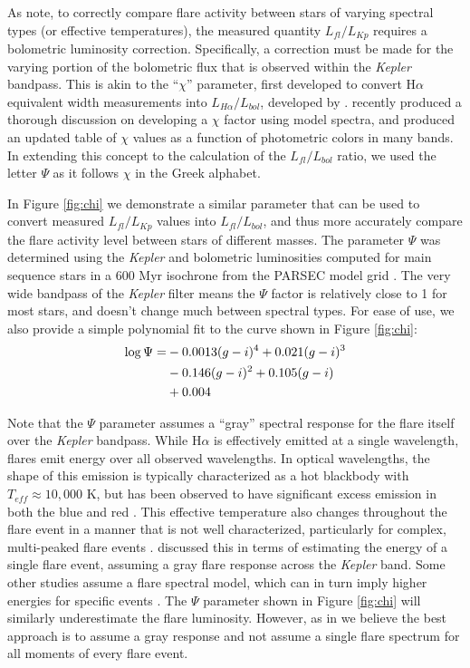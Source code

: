 \documentclass[preprint2]{aastex62}
\newcommand{\Kepler}{\textsl{Kepler}\xspace}
\begin{document}
As \citet{lurie2015} note, to correctly compare flare activity between stars of varying spectral types (or effective temperatures), the measured quantity $L_{fl}/L_{Kp}$ requires a bolometric luminosity correction. Specifically, a correction must be made for the varying portion of the bolometric flux that is observed within the \Kepler bandpass. This is akin to the ``$\chi$'' parameter, first developed to convert H$\alpha$ equivalent width measurements into  $L_{H\alpha}/L_{bol}$, developed by \citet{walkowicz2004}. \citet{douglas2014} recently produced a thorough discussion on developing a $\chi$ factor using model spectra, and produced an updated table of $\chi$ values as a function of photometric colors in many bands. In extending this concept to the calculation of the $L_{fl}/L_{bol}$ ratio, we used the letter $\Psi$ as it follows $\chi$ in the Greek alphabet.

In Figure \ref{fig:chi} we demonstrate a similar parameter that can be used to convert measured $L_{fl}/L_{Kp}$ values into $L_{fl}/L_{bol}$, and thus more accurately compare the flare activity level between stars of different masses. The parameter $\Psi$ was determined using the \Kepler and bolometric luminosities computed for main sequence stars in a 600 Myr isochrone from the PARSEC model grid \citet{bressan2012}. The very wide bandpass of the \Kepler filter means the $\Psi$ factor is relatively close to 1 for most stars, and doesn't change much between spectral types. For ease of use, we also provide a simple polynomial fit to the curve shown in Figure \ref{fig:chi}:
\begin{eqnarray}
\log \Psi =& -0.0013 (g-i)^4 + 0.021 (g-i)^3 \notag \\
& -0.146 (g-i)^2 + 0.105 (g-i) \notag \\ 
& + 0.004
\end{eqnarray}


Note that the $\Psi$ parameter assumes a ``gray'' spectral response for the flare itself over the \Kepler bandpass. While H$\alpha$ is effectively emitted at a single wavelength, flares emit energy over all observed wavelengths. In optical wavelengths, the shape of this emission is typically characterized as a hot blackbody with $T_{eff}\approx10,000$ K, but has been observed to have significant excess emission in both the blue and red \citep[e.g. see][]{kowalski2013}. This effective temperature also changes throughout the flare event in a manner that is not well characterized, particularly for complex, multi-peaked flare events \citep[e.g.][]{slhadleo,kowalski2012}. \citet{davenport2016} discussed this in terms of estimating the energy of a single flare event, assuming a gray flare response across the \Kepler band. Some other studies assume a flare spectral model, which can in turn imply higher energies for specific events \citep[e.g.][]{gizis2013,maehara2015}. The $\Psi$ parameter shown in Figure \ref{fig:chi} will similarly underestimate the flare luminosity. However, as in \citet{davenport2016} we believe the best approach is to assume a gray response and not assume a single flare spectrum for all moments of every flare event.
\end{document}

